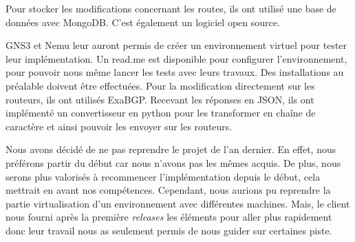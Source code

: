Pour stocker les modifications concernant les routes, ils ont utilisé une base de données avec MongoDB. C'est également un logiciel open source. 

GNS3 et Nemu leur auront permis de créer un environnement virtuel pour tester leur implémentation. Un read.me est disponible pour configurer l'environnement, pour pouvoir nous même lancer les tests avec leurs travaux. Des installations au préalable doivent être effectuées.
Pour la modification directement sur les routeurs, ils ont utilisés ExaBGP. Recevant les réponses en JSON, ils ont implémenté un convertisseur en python pour les transformer en chaîne de caractère et ainsi pouvoir les envoyer sur les routeurs.

Nous avons décidé de ne pas reprendre le projet de l'an dernier. En effet, nous préférons partir du début car nous n'avons pas les mêmes acquis. De plus, nous serons plus valorisés à recommencer l'implémentation depuis le début, cela mettrait en avant nos compétences. Cependant, nous aurions pu reprendre la partie virtualisation d'un environnement avec différentes machines. Mais, le client nous fourni après la première \textit{releases} les éléments pour aller plus rapidement donc leur travail nous as seulement permis de nous guider sur certaines piste.
